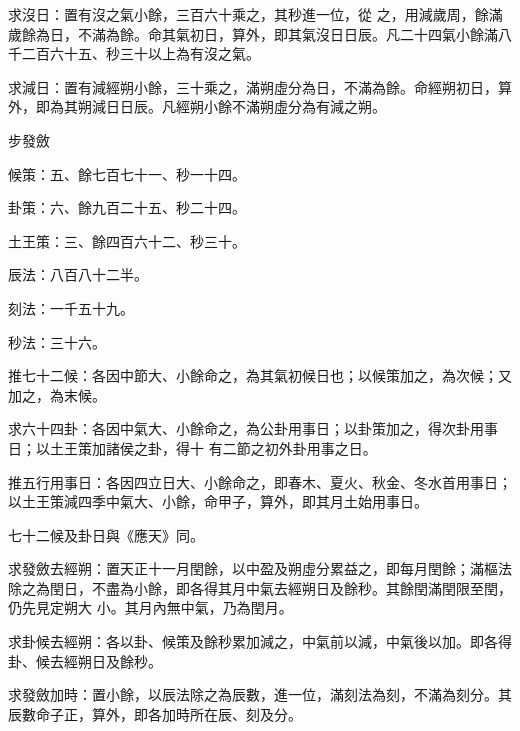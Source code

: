 \begin{pinyinscope}
 求沒日：置有沒之氣小餘，三百六十乘之，其秒進一位，從
 之，用減歲周，餘滿歲餘為日，不滿為餘。命其氣初日，算外，即其氣沒日日辰。凡二十四氣小餘滿八千二百六十五、秒三十以上為有沒之氣。



 求減日：置有減經朔小餘，三十乘之，滿朔虛分為日，不滿為餘。命經朔初日，算外，即為其朔減日日辰。凡經朔小餘不滿朔虛分為有減之朔。



 步發斂



 候策：五、餘七百七十一、秒一十四。



 卦策：六、餘九百二十五、秒二十四。



 土王策：三、餘四百六十二、秒三十。



 辰法：八百八十二半。



 刻法：一千五十九。



 秒法：三十六。



 推七十二候：各因中節大、小餘命之，為其氣初候日也；以候策加之，為次候；又加之，為末候。



 求六十四卦：各因中氣大、小餘命之，為公卦用事日；以卦策加之，得次卦用事日；以土王策加諸侯之卦，得十
 有二節之初外卦用事之日。



 推五行用事日：各因四立日大、小餘命之，即春木、夏火、秋金、冬水首用事日；以土王策減四季中氣大、小餘，命甲子，算外，即其月土始用事日。



 七十二候及卦日與《應天》同。



 求發斂去經朔：置天正十一月閏餘，以中盈及朔虛分累益之，即每月閏餘；滿樞法除之為閏日，不盡為小餘，即各得其月中氣去經朔日及餘秒。其餘閏滿閏限至閏，仍先見定朔大
 小。其月內無中氣，乃為閏月。



 求卦候去經朔：各以卦、候策及餘秒累加減之，中氣前以減，中氣後以加。即各得卦、候去經朔日及餘秒。



 求發斂加時：置小餘，以辰法除之為辰數，進一位，滿刻法為刻，不滿為刻分。其辰數命子正，算外，即各加時所在辰、刻及分。



\end{pinyinscope}